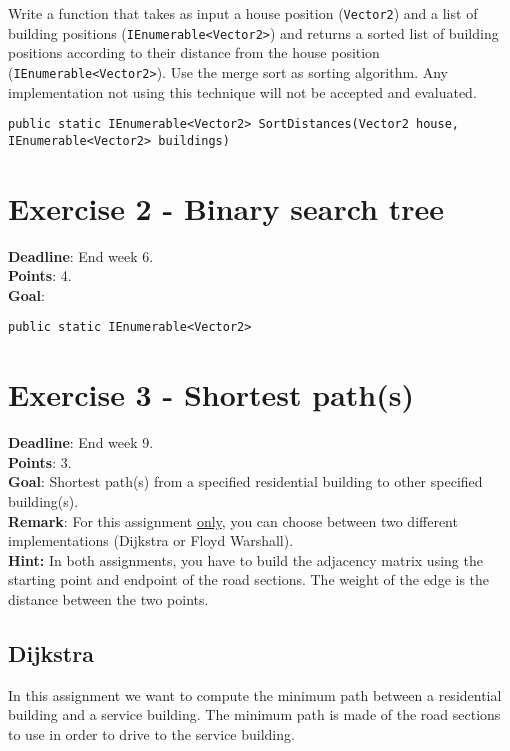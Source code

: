 \documentclass[10pt,a4paper]{article}
\begin{document}
Write a function that takes as input a house position (\texttt{Vector2}) and a list of building positions (\texttt{IEnumerable<Vector2>}) and returns a sorted list of building positions according to their distance from the house position (\texttt{IEnumerable<Vector2>}). Use the merge sort as sorting algorithm. Any implementation not using this technique will not be accepted and evaluated.

\begin{lstlisting}
public static IEnumerable<Vector2> SortDistances(Vector2 house, IEnumerable<Vector2> buildings)
\end{lstlisting}

\section*{Exercise 2 - Binary search tree}
\textbf{Deadline}: End week 6. \\
\textbf{Points}: 4. \\
\textbf{Goal}: \\

\begin{lstlisting}
public static IEnumerable<Vector2> 
\end{lstlisting}
\section*{Exercise 3 - Shortest path(s)}
\textbf{Deadline}: End week 9. \\
\textbf{Points}: 3. \\
\textbf{Goal}: Shortest path(s) from a specified residential building to other specified building(s).\\
\textbf{Remark}: For this assignment \underline{only}, you can choose between two different implementations (Dijkstra or Floyd Warshall).\\

\noindent
\textbf{Hint:} In both assignments, you have to build the adjacency matrix using the starting point and endpoint of the road sections. The weight of the edge is the distance between the two points.

\subsection*{Dijkstra}
In this assignment we want to compute the minimum path between a residential building and a service building. The minimum path is made of the road sections to use in order to drive to the service building.
\end{document}
